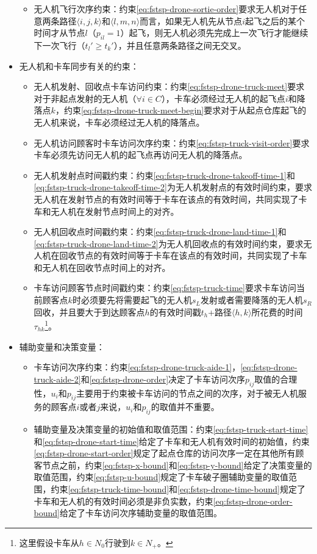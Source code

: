 \begin{itemize}
\begin{itemize}
        \item 无人机飞行次序约束：约束\ref{eq:fstsp-drone-sortie-order}要求无人机对于任意两条路径$\langle i,j,k \rangle$和$\langle l,m,n \rangle$而言，如果无人机先从节点$i$起飞之后的某个时间才从节点$l$（$p_{il}=1$）起飞，则无人机必须先完成上一次飞行才能继续下一次飞行（$t_l'\geq t_k'$），并且任意两条路径之间无交叉。
    \end{itemize}
    \item \colorbox{shallow-yellow}{无人机和卡车同步有关的约束：}
    \begin{itemize}
        \item 无人机发射、回收点卡车访问约束：约束\ref{eq:fstsp-drone-truck-meet}要求对于非起点发射的无人机（$\forall i \in C$），卡车必须经过无人机的起飞点$i$和降落点$k$，约束\ref{eq:fstsp-drone-truck-meet-begin}要求对于从起点仓库起飞的无人机来说，卡车必须经过无人机的降落点。
        \item 无人机访问顾客时卡车访问次序约束：约束\ref{eq:fstsp-truck-visit-order}要求卡车必须先访问无人机的起飞点再访问无人机的降落点。
        \item 无人机发射点时间戳约束：约束\ref{eq:fstsp-truck-drone-takeoff-time-1}和\ref{eq:fstsp-truck-drone-takeoff-time-2}为无人机发射点的有效时间约束，要求无人机在发射节点的有效时间等于卡车在该点的有效时间，共同实现了卡车和无人机在发射节点时间上的对齐。
        \item 无人机回收点时间戳约束：约束\ref{eq:fstsp-truck-drone-land-time-1}和\ref{eq:fstsp-truck-drone-land-time-2}为无人机回收点的有效时间约束，要求无人机在回收节点的有效时间等于卡车在该点的有效时间，共同实现了卡车和无人机在回收节点时间上的对齐。
        \item 卡车访问顾客节点时间戳约束：约束\ref{eq:fstsp-truck-time}要求卡车访问当前顾客点$k$时必须要先将需要起飞的无人机$s_L$发射或者需要降落的无人机$s_R$回收，并且要大于到达顾客点$h$的有效时间戳$t_h$+路径$\langle h,k \rangle$所花费的时间$\tau_{hk}$\footnote{这里假设卡车从$h \in N_0$行驶到$k \in N_+$。}。
    \end{itemize}
    \item 辅助变量和决策变量：
    \begin{itemize}
        \item 卡车访问次序约束：约束\ref{eq:fstsp-drone-truck-aide-1}，\ref{eq:fstsp-drone-truck-aide-2}和\ref{eq:fstsp-drone-order}决定了卡车访问次序$p_{ij}$取值的合理性，$u_i$和$p_{ij}$主要用于约束被卡车访问的节点之间的次序，对于被无人机服务的顾客点$i$或者$j$来说，$u_i$和$p_{ij}$的取值并不重要。
        \item 辅助变量及决策变量的初始值和取值范围：约束\ref{eq:fstsp-truck-start-time}和\ref{eq:fstsp-drone-start-time}给定了卡车和无人机有效时间的初始值，约束\ref{eq:fstsp-drone-start-order}规定了起点仓库的访问次序一定在其他所有顾客节点之前，约束\ref{eq:fstsp-x-bound}和\ref{eq:fstsp-y-bound}给定了决策变量的取值范围，约束\ref{eq:fstsp-u-bound}规定了卡车破子圈辅助变量的取值范围，约束\ref{eq:fstsp-truck-time-bound}和\ref{eq:fstsp-drone-time-bound}规定了卡车和无人机的有效时间必须是非负实数，约束\ref{eq:fstsp-drone-order-bound}给定了卡车访问次序辅助变量的取值范围。
    \end{itemize}
\end{itemize}

